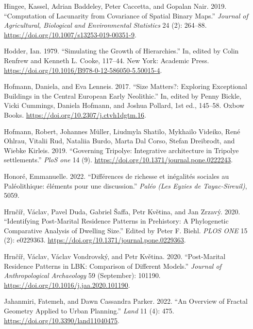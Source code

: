 \documentclass[
  12pt,
  a4paper, twoside]{book}
\newlength{\cslhangindent}
\newlength{\cslentryspacingunit} %
\newenvironment{CSLReferences}[2] %
 {%
  \setlength{\parindent}{0pt}
  \ifodd #1
  \let\oldpar\par
  \def\par{\hangindent=\cslhangindent\oldpar}
  \fi
  \setlength{\parskip}{#2\cslentryspacingunit}
 }%
 {}
\begin{document}
\begin{CSLReferences}{1}{0}
\leavevmode{}%
Hingee, Kassel, Adrian Baddeley, Peter Caccetta, and Gopalan Nair. 2019. {``Computation of Lacunarity from Covariance of Spatial Binary Maps.''} \emph{Journal of Agricultural, Biological and Environmental Statistics} 24 (2): 264--88. \url{https://doi.org/10.1007/s13253-019-00351-9}.

\leavevmode{}%
Hodder, Ian. 1979. {``Simulating the Growth of Hierarchies.''} In, edited by Colin Renfrew and Kenneth L. Cooke, 117--44. New York: Academic Press. \url{https://doi.org/10.1016/B978-0-12-586050-5.50015-4}.

\leavevmode{}%
Hofmann, Daniela, and Eva Lenneis. 2017. {``Size Matters?: Exploring Exceptional Buildings in the Central European Early Neolithic.''} In, edited by Penny Bickle, Vicki Cummings, Daniela Hofmann, and Joshua Pollard, 1st ed., 145--58. Oxbow Books. \url{https://doi.org/10.2307/j.ctvh1dgtm.16}.

\leavevmode{}%
Hofmann, Robert, Johannes Müller, Liudmyla Shatilo, Mykhailo Videiko, René Ohlrau, Vitalii Rud, Nataliia Burdo, Marta Dal Corso, Stefan Dreibrodt, and Wiebke Kirleis. 2019. {``Governing Tripolye: Integrative architecture in Tripolye settlements.''} \emph{PloS one} 14 (9). \url{https://doi.org/10.1371/journal.pone.0222243}.

\leavevmode{}%
Honoré, Emmanuelle. 2022. {``Différences de richesse et inégalités sociales au Paléolithique: éléments pour une discussion.''} \emph{Paléo (Les Eyzies de Tayac-Sireuil)}, 5059.

\leavevmode{}%
Hrnčíř, Václav, Pavel Duda, Gabriel Šaffa, Petr Květina, and Jan Zrzavý. 2020. {``Identifying Post-Marital Residence Patterns in Prehistory: A Phylogenetic Comparative Analysis of Dwelling Size.''} Edited by Peter F. Biehl. \emph{PLOS ONE} 15 (2): e0229363. \url{https://doi.org/10.1371/journal.pone.0229363}.

\leavevmode{}%
Hrnčíř, Václav, Václav Vondrovský, and Petr Květina. 2020. {``Post-Marital Residence Patterns in LBK: Comparison of Different Models.''} \emph{Journal of Anthropological Archaeology} 59 (September): 101190. \url{https://doi.org/10.1016/j.jaa.2020.101190}.

\leavevmode{}%
Jahanmiri, Fatemeh, and Dawn Cassandra Parker. 2022. {``An Overview of Fractal Geometry Applied to Urban Planning.''} \emph{Land} 11 (4): 475. \url{https://doi.org/10.3390/land11040475}.


\end{CSLReferences}
\end{document}

